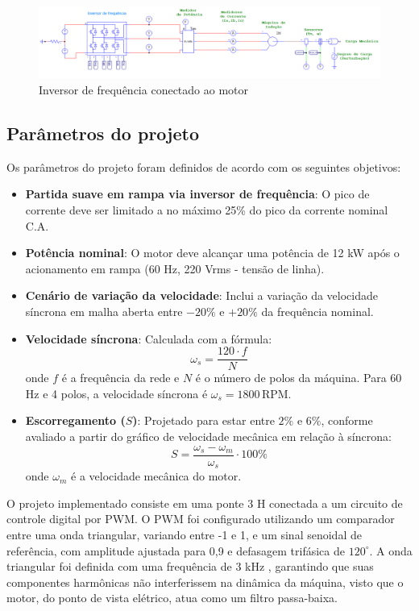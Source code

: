 \documentclass[a4paper, 11pt]{article}
\begin{document}
\begin{figure}[H]
    \centering
    \includegraphics[width=1\linewidth]{images/inversor_de_frequencia_conectado_motor.png}
    \caption{Inversor de frequência conectado ao motor}
    \label{fig:inversor_de_frequencia_conectado_motor}
\end{figure}

\subsection{Parâmetros do projeto}

Os parâmetros do projeto foram definidos de acordo com os seguintes objetivos:

\begin{itemize}
    \item \textbf{Partida suave em rampa via inversor de frequência}: O pico de corrente deve ser limitado a no máximo 25\% do pico da corrente nominal C.A.
    \item \textbf{Potência nominal}: O motor deve alcançar uma potência de 12 kW após o acionamento em rampa (60 Hz, 220 Vrms - tensão de linha).
    \item \textbf{Cenário de variação da velocidade}: Inclui a variação da velocidade síncrona em malha aberta entre $-20 \%$ e $+20 \%$ da frequência nominal.
    \item \textbf{Velocidade síncrona}: Calculada com a fórmula:
    \[
    \omega_s = \frac{120 \cdot f}{N}
    \]
    onde $f$ é a frequência da rede e $N$ é o número de polos da máquina. Para 60 Hz e 4 polos, a velocidade síncrona é $\omega_s = 1800 \, \mathrm{RPM}$.
    \item \textbf{Escorregamento ($S$)}: Projetado para estar entre $2 \%$ e $6 \%$, conforme avaliado a partir do gráfico de velocidade mecânica em relação à síncrona:
    \[
    S = \frac{\omega_s - \omega_m}{\omega_s} \cdot 100 \%
    \]
    onde $\omega_m$ é a velocidade mecânica do motor.
\end{itemize}

O projeto implementado consiste em uma ponte 3 H conectada a um circuito de controle digital por PWM. O PWM foi configurado utilizando um comparador entre uma onda triangular, variando entre -1 e 1, e um sinal senoidal de referência, com amplitude ajustada para 0,9 e defasagem trifásica de $120^{\circ}$. A onda triangular foi definida com uma frequência de 3 kHz , garantindo que suas componentes harmônicas não interferissem na dinâmica da máquina, visto que o motor, do ponto de vista elétrico, atua como um filtro passa-baixa.
\end{document}
